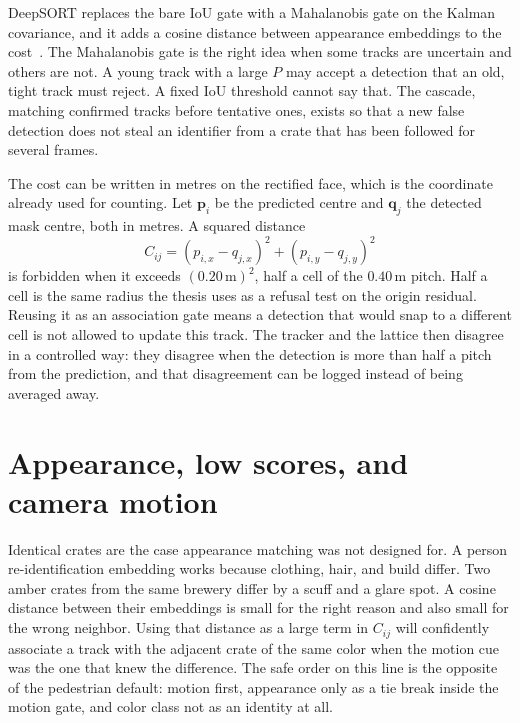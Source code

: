 \documentclass[11pt,a4paper]{article}
\begin{document}
DeepSORT replaces the bare IoU gate with a Mahalanobis gate on the Kalman covariance, and it adds a cosine distance between appearance embeddings to the cost~\cite{wojke2017deepsort}. The Mahalanobis gate is the right idea when some tracks are uncertain and others are not. A young track with a large $P$ may accept a detection that an old, tight track must reject. A fixed IoU threshold cannot say that. The cascade, matching confirmed tracks before tentative ones, exists so that a new false detection does not steal an identifier from a crate that has been followed for several frames.

The cost can be written in metres on the rectified face, which is the coordinate already used for counting. Let $\mathbf{p}_i$ be the predicted centre and $\mathbf{q}_j$ the detected mask centre, both in metres. A squared distance
\begin{equation}
C_{ij} = (p_{i,x}-q_{j,x})^2 + (p_{i,y}-q_{j,y})^2
\label{eq:costm}
\end{equation}
is forbidden when it exceeds $(0.20\,\mathrm{m})^2$, half a cell of the $0.40\,\mathrm{m}$ pitch. Half a cell is the same radius the thesis uses as a refusal test on the origin residual. Reusing it as an association gate means a detection that would snap to a different cell is not allowed to update this track. The tracker and the lattice then disagree in a controlled way: they disagree when the detection is more than half a pitch from the prediction, and that disagreement can be logged instead of being averaged away.

\section{Appearance, low scores, and camera motion}
\label{sec:modern}

Identical crates are the case appearance matching was not designed for. A person re-identification embedding works because clothing, hair, and build differ. Two amber crates from the same brewery differ by a scuff and a glare spot. A cosine distance between their embeddings is small for the right reason and also small for the wrong neighbor. Using that distance as a large term in $C_{ij}$ will confidently associate a track with the adjacent crate of the same color when the motion cue was the one that knew the difference. The safe order on this line is the opposite of the pedestrian default: motion first, appearance only as a tie break inside the motion gate, and color class not as an identity at all.
\end{document}
